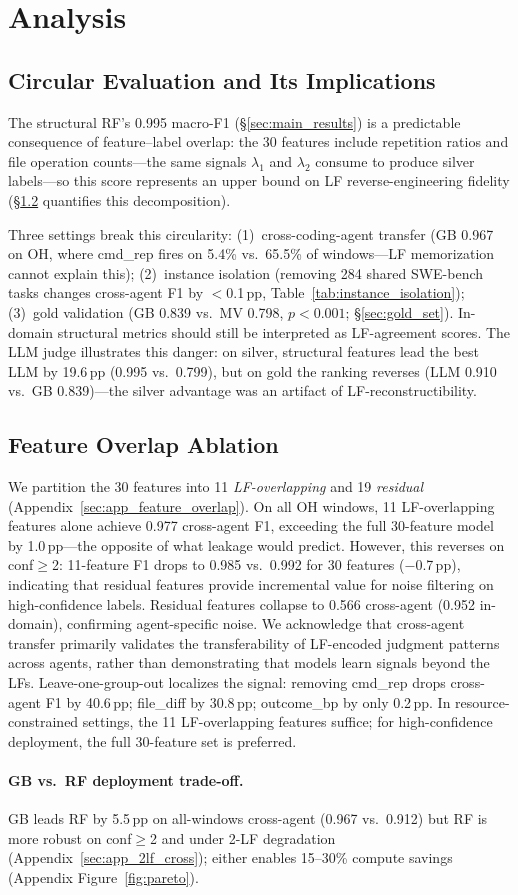\section{Analysis}
\label{sec:analysis}

\subsection{Circular Evaluation and Its Implications}
\label{sec:circular}

The structural RF's 0.995 macro-F1 (\S\ref{sec:main_results}) is a predictable consequence of feature--label overlap: the 30 features include repetition ratios and file operation counts---the same signals $\lambda_1$ and $\lambda_2$ consume to produce silver labels---so this score represents an upper bound on LF reverse-engineering fidelity (\S\ref{sec:feature_overlap} quantifies this decomposition).

Three settings break this circularity: (1)~cross-coding-agent transfer (GB 0.967 on OH, where cmd\_rep fires on 5.4\% vs.\ 65.5\% of windows---LF memorization cannot explain this); (2)~instance isolation (removing 284 shared SWE-bench tasks changes cross-agent F1 by ${<}$0.1\,pp, Table~\ref{tab:instance_isolation}); (3)~gold validation (GB 0.839 vs.\ MV 0.798, $p{<}0.001$; \S\ref{sec:gold_set}).
In-domain structural metrics should still be interpreted as LF-agreement scores.
The LLM judge illustrates this danger: on silver, structural features lead the best LLM by 19.6\,pp (0.995 vs.\ 0.799), but on gold the ranking reverses (LLM 0.910 vs.\ GB 0.839)---the silver advantage was an artifact of LF-reconstructibility.

\subsection{Feature Overlap Ablation}
\label{sec:feature_overlap}

We partition the 30 features into 11 \emph{LF-overlapping} and 19 \emph{residual} (Appendix~\ref{sec:app_feature_overlap}).
On all OH windows, 11 LF-overlapping features alone achieve 0.977 cross-agent F1, exceeding the full 30-feature model by 1.0\,pp---the opposite of what leakage would predict.
However, this reverses on conf${\geq}$2: 11-feature F1 drops to 0.985 vs.\ 0.992 for 30 features ($-$0.7\,pp), indicating that residual features provide incremental value for noise filtering on high-confidence labels.
Residual features collapse to 0.566 cross-agent (0.952 in-domain), confirming agent-specific noise.
We acknowledge that cross-agent transfer primarily validates the transferability of LF-encoded judgment patterns across agents, rather than demonstrating that models learn signals beyond the LFs.
Leave-one-group-out localizes the signal: removing cmd\_rep drops cross-agent F1 by 40.6\,pp; file\_diff by 30.8\,pp; outcome\_bp by only 0.2\,pp.
In resource-constrained settings, the 11 LF-overlapping features suffice; for high-confidence deployment, the full 30-feature set is preferred.

\paragraph{GB vs.\ RF deployment trade-off.}
GB leads RF by 5.5\,pp on all-windows cross-agent (0.967 vs.\ 0.912) but RF is more robust on conf${\geq}$2 and under 2-LF degradation (Appendix~\ref{sec:app_2lf_cross}); either enables 15--30\% compute savings (Appendix Figure~\ref{fig:pareto}).